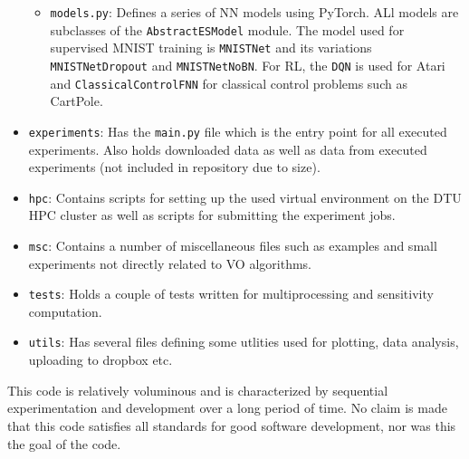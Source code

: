 \begin{itemize}
\begin{itemize}
            \item \texttt{models.py}: Defines a series of \gls{NN} models using PyTorch. ALl models are subclasses of the \texttt{AbstractESModel} module.
            The model used for supervised MNIST training is \texttt{MNISTNet} and its variations \texttt{MNISTNetDropout} and \texttt{MNISTNetNoBN}. For \gls{RL}, the \texttt{DQN} is used for Atari and \texttt{ClassicalControlFNN} for classical control problems such as CartPole.
        \end{itemize}
    \item \texttt{experiments}: Has the \texttt{main.py} file which is the entry point for all executed experiments. Also holds downloaded data as well as data from executed experiments (not included in repository due to size).
    \item \texttt{hpc}: Contains scripts for setting up the used virtual environment on the DTU HPC cluster as well as scripts for submitting the experiment jobs.
    \item \texttt{msc}: Contains a number of miscellaneous files such as examples and small experiments not directly related to \gls{VO} algorithms.
    \item \texttt{tests}: Holds a couple of tests written for multiprocessing and sensitivity computation.
    \item \texttt{utils}: Has several files defining some utlities used for plotting, data analysis, uploading to dropbox etc.
\end{itemize}
This code is relatively voluminous and is characterized by sequential experimentation and development over a long period of time. No claim is made that this code satisfies all standards for good software development, nor was this the goal of the code.

